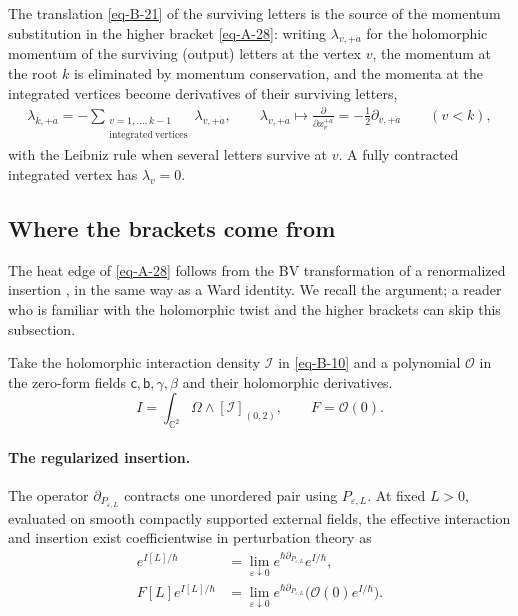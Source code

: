 \documentclass[11pt]{article}
\numberwithin{equation}{section}
\numberwithin{figure}{section}
\numberwithin{table}{section}
\begin{document}
The translation \eqref{eq-B-21} of the surviving letters is the source of the momentum substitution in the higher bracket \eqref{eq-A-28}: writing $\lambda_{v,+\dot a}$ for the holomorphic momentum of the surviving (output) letters at the vertex $v$, the momentum at the root $k$ is eliminated by momentum conservation, and the momenta at the integrated vertices become derivatives of their surviving letters,
\begin{equation}\label{eq-D-lambda}
\begin{gathered}\lambda_{k,+\dot a}=-\sum_{\substack{v=1,\ldots,k-1\\\mathrm{integrated\ vertices}}}\lambda_{v,+\dot a},\qquad\lambda_{v,+\dot a}\longmapsto\frac{\partial}{\partial x_v^{+\dot a}}=-\frac12\partial_{v,+\dot a}\qquad(v<k),\end{gathered}
\end{equation}
with the Leibniz rule when several letters survive at $v$. A fully contracted integrated vertex has $\lambda_v=0$.

\subsection{Where the brackets come from}\label{sec-brackets-origin}

The heat edge of \eqref{eq-A-28} follows from the BV transformation of a renormalized insertion \cite{Costello,semichiral,higher,BK}, in the same way as a Ward identity. We recall the argument; a reader who is familiar with the holomorphic twist and the higher brackets can skip this subsection.

Take the holomorphic interaction density $\mathcal I$ in \eqref{eq-B-10} and a polynomial $\mathcal O$ in the zero-form fields $\mathsf c,\mathsf b,\gamma,\beta$ and their holomorphic derivatives.
\begin{equation*}
I=\int_{\mathbb C^2}\Omega\wedge[\mathcal I]_{(0,2)},
\qquad F=\mathcal O(0).
\end{equation*}

\paragraph{The regularized insertion.}

The operator $\partial_{P_{\varepsilon,L}}$ contracts one unordered pair using $P_{\varepsilon,L}$. At fixed $L>0$, evaluated on smooth compactly supported external fields, the effective interaction and insertion exist coefficientwise in perturbation theory \cite[Theorem 5 and Corollary 4]{Wang} as
\begin{equation}\label{eq-C-local-to-effective}
\begin{aligned}
e^{I[L]/\hbar}
&=\lim_{\varepsilon\downarrow0}
 e^{\hbar\partial_{P_{\varepsilon,L}}}e^{I/\hbar},\\
F[L]e^{I[L]/\hbar}
&=\lim_{\varepsilon\downarrow0}
 e^{\hbar\partial_{P_{\varepsilon,L}}}
 \bigl(\mathcal O(0)e^{I/\hbar}\bigr).
\end{aligned}
\end{equation}
\end{document}
